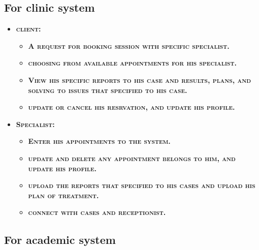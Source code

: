 \documentclass[../Psychological_system_web_application.tex]{subfiles}
\begin{document}
				\subsection{For clinic system}
				\begin{itemize}
					\item
							\textbf{\textsc{\color{red}client:}}
					\begin{itemize}
						\item
							\textbf{\textsc{\color{blue}A request for booking session with specific specialist.}}
						\item
							\textbf{\textsc{\color{blue}choosing from available appointments for his specialist.}}
						\item
							\textbf{\textsc{\color{blue}View his specific reports to his case and results, plans, and solving to issues that specified to his case.}}
						\item
							\textbf{\textsc{\color{blue}update or cancel his resrvation, and update his profile.}}
					\end{itemize}
					
					\item
							\textbf{\textsc{\color{red}Specialist:}}
							\begin{itemize}
							\item
								\textbf{\textsc{\color{blue}Enter his appointments to the system.}}
							\item
								\textbf{\textsc{\color{blue}update and delete any appointment belongs to him, and update his profile.}}
							\item
								\textbf{\textsc{\color{blue}upload the reports that specified to his cases and upload his plan of treatment.}}
							\item
								\textbf{\textsc{\color{blue}connect with cases and receptionist.}}
					\end{itemize}
				\end{itemize}
				
				\subsection{For academic system}
				
\end{document}
